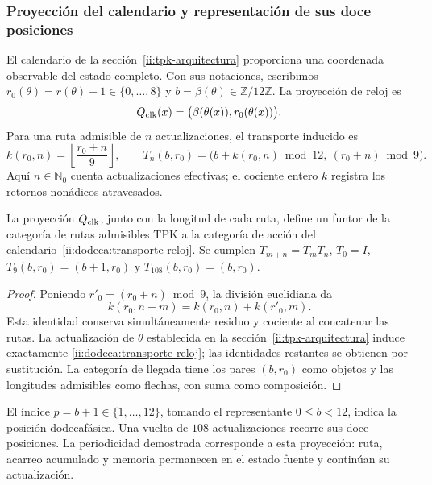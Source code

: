 \subsubsection{Proyección del calendario y representación de sus doce posiciones}
\label{ii:dodeca:calendario}
El calendario de la sección~\ref{ii:tpk-arquitectura} proporciona una
coordenada observable del estado completo. Con sus notaciones, escribimos
\(r_0(\theta)=r(\theta)-1\in\{0,\ldots,8\}\) y
\(b=\beta(\theta)\in\mathbb Z/12\mathbb Z\). La proyección de reloj es
\[
 Q_{\rm clk}(x)=\bigl(\beta(\theta(x)),r_0(\theta(x))\bigr).
\]
Para una ruta admisible de \(n\) actualizaciones, el transporte inducido es
\begin{equation}
 k(r_0,n)=\left\lfloor\frac{r_0+n}{9}\right\rfloor,
 \qquad
 T_n(b,r_0)=\bigl(b+k(r_0,n)\bmod12,\ (r_0+n)\bmod9\bigr).
 \label{ii:dodeca:transporte-reloj}
\end{equation}
Aquí \(n\in\mathbb N_0\) cuenta actualizaciones efectivas; el cociente
entero \(k\) registra los retornos nonádicos atravesados.

\begin{proposition}
\label{ii:dodeca:composicion}
La proyección \(Q_{\rm clk}\), junto con la longitud de cada ruta, define
un funtor de la categoría de rutas admisibles TPK a la categoría de acción
del calendario~\eqref{ii:dodeca:transporte-reloj}. Se cumplen
\(T_{m+n}=T_mT_n\), \(T_0=I\),
\(T_9(b,r_0)=(b+1,r_0)\) y \(T_{108}(b,r_0)=(b,r_0)\).
\end{proposition}
\begin{proof}
Poniendo \(r'_0=(r_0+n)\bmod9\), la división euclidiana da
\[
 k(r_0,n+m)=k(r_0,n)+k(r'_0,m).
\]
Esta identidad conserva simultáneamente residuo y cociente al concatenar
las rutas. La actualización de \(\theta\) establecida en la
sección~\ref{ii:tpk-arquitectura} induce exactamente
\eqref{ii:dodeca:transporte-reloj}; las identidades restantes se obtienen
por sustitución. La categoría de llegada tiene los pares \((b,r_0)\) como
objetos y las longitudes admisibles como flechas, con suma como composición.
\end{proof}

El índice \(p=b+1\in\{1,\ldots,12\}\), tomando el representante
\(0\le b<12\), indica la posición dodecafásica. Una vuelta de
\(108\) actualizaciones recorre sus doce posiciones. La periodicidad
demostrada corresponde a esta proyección: ruta, acarreo acumulado y
memoria permanecen en el estado fuente y continúan su actualización.

